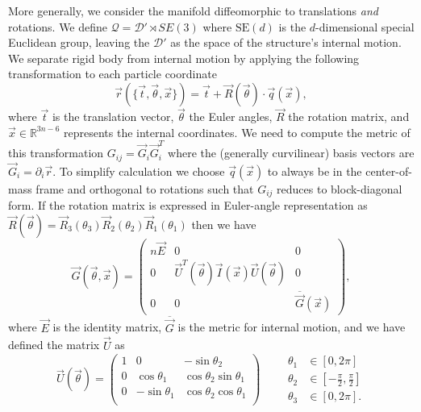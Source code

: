 \documentclass[11pt,twoside]{report}
\begin{document}
More generally, we consider the manifold diffeomorphic to translations \emph{and} rotations.
We define $\mathcal{Q} = \mathcal{D}' \rtimes SE(3)$ where $\textrm{SE}(d)$ is the $d$-dimensional special Euclidean group, leaving the $\mathcal{D}'$ as the space of the structure's internal motion.
We separate rigid body from internal motion by applying the following transformation to each particle coordinate
\begin{equation}
  \vec{r}(\{\vec{t}, \vec{\theta}, \vec{x}\}) =
  \vec{t} + \vec{R}(\vec{\theta}) \cdot \vec{q}(\vec{x}),
\end{equation}
where $\vec{t}$ is the translation vector, $\vec{\theta}$ the Euler angles, $\vec{R}$ the rotation matrix, and $\vec{x} \in \mathbb{R}^{3n-6}$ represents the internal coordinates.
We need to compute the metric of this transformation $G_{ij} = \vec{G}_i \vec{G}_i^T$ where the (generally curvilinear) basis vectors are $\vec{G}_i = \partial_i \vec{r}$.
To simplify calculation we choose $\vec{q}(\vec{x})$ to always be in the center-of-mass frame and orthogonal to rotations such that $G_{ij}$ reduces to block-diagonal form.
If the rotation matrix is expressed in Euler-angle representation as $\vec{R}(\vec{\theta}) = \vec{R}_3(\theta_3) \vec{R}_2(\theta_2) \vec{R}_1(\theta_1)$ then we have
\begin{equation}
  \vec{G}(\vec{\theta}, \vec{x}) =
  \begin{pmatrix}
    n \vec{E} & 0 & 0 \\
    0 & \vec{U}^T(\vec{\theta}) \vec{I}(\vec{x}) \vec{U}(\vec{\theta}) & 0 \\
    0 & 0 & \overline{\vec{G}}(\vec{x})
  \end{pmatrix},
\end{equation}
where $\vec{E}$ is the identity matrix, $\overline{\vec{G}}$ is the metric for internal motion, and we have defined the matrix $\vec{U}$ as%
\begin{equation}
  \vec{U}(\vec{\theta}) =
  \begin{pmatrix}
    1 &  0              & -\sin{\theta_2} \\
    0 &  \cos{\theta_1} &  \cos{\theta_2} \sin{\theta_1} \\
    0 & -\sin{\theta_1} &  \cos{\theta_2} \cos{\theta_1} \\
  \end{pmatrix}
  \qquad
  \begin{aligned}
    \theta_1 &\in [0,2\pi] \\
    \theta_2 &\in \left[-\frac{\pi}{2},\frac{\pi}{2}\right] \\
    \theta_3 &\in [0,2\pi].
  \end{aligned}
\end{equation}
\end{document}
